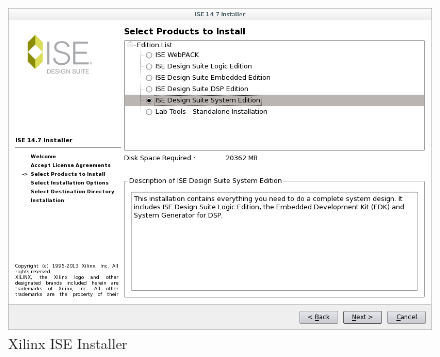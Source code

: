 \begin{flushleft}
\begin{flushleft}
\begin{enumerate}
\begin{figure}[H]
	\centerline{\includegraphics[scale=0.4]{figures/xilinx_ise_install}}
	\caption{Xilinx ISE Installer}
\end{figure}


\end{enumerate}
\end{flushleft}
\end{flushleft}
